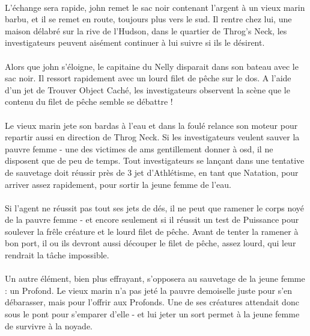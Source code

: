 \paragraph{} L'échange sera rapide, \gls{john} remet le sac noir contenant l'argent à un vieux marin barbu, et il se remet en route, toujours plus 
vers le sud. Il rentre chez lui, une maison délabré sur la rive de l'Hudson, dans le quartier de Throg's Neck, les investigateurs peuvent aisément 
continuer à lui suivre si ils le désirent.

\paragraph{} Alors que \gls{john} s'éloigne, le capitaine du Nelly disparait dans son bateau avec le sac noir. Il ressort rapidement avec un lourd
filet de pêche sur le dos. A l'aide d'un jet de Trouver Object Caché, les investigateurs observent la scène que le contenu du filet de pêche semble
se débattre !

\paragraph{} Le vieux marin jete son bardas à l'eau et dans la foulé relance son moteur pour repartir aussi en direction de Throg Neck. Si les 
investigateurs veulent sauver la pauvre femme - une des victimes de \gls{ams} gentillement donner à \gls{osd}, il ne disposent que de peu de temps. Tout investigateurs 
se lançant dans une tentative de sauvetage doit réussir près de 3 jet d'Athlétisme, en tant que Natation, pour arriver assez rapidement, pour sortir
la jeune femme de l'eau.

\paragraph{} Si l'agent ne réussit pas tout ses jets de dés, il ne peut que ramener le corps noyé de la pauvre femme - et encore seulement si il réussit
un test de Puissance pour soulever la frêle créature et le lourd filet de pêche. Avant de tenter la ramener à bon port, il ou ils devront aussi
découper le filet de pêche, assez lourd, qui leur rendrait la tâche impossible. 

\paragraph{} Un autre élément, bien plus effrayant, s'opposera au sauvetage de la jeune femme : un Profond. Le vieux marin n'a pas jeté la pauvre
demoiselle juste pour s'en débarasser, mais pour l'offrir aux Profonds. Une de ses créatures attendait donc sous le pont pour s'emparer d'elle - et
lui jeter un sort permet à la jeune femme de survivre à la noyade. 

